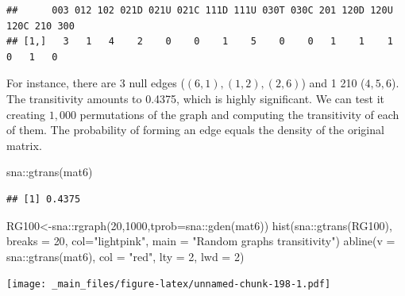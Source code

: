 \documentclass[
  notitlepage,
  onecolumn,
  openany]{book}
\newenvironment{Shaded}{\begin{snugshade}}{\end{snugshade}}
\newcommand{\AttributeTok}[1]{\textcolor[rgb]{0.77,0.63,0.00}{#1}}
\newcommand{\DecValTok}[1]{\textcolor[rgb]{0.00,0.00,0.81}{#1}}
\newcommand{\FunctionTok}[1]{\textcolor[rgb]{0.00,0.00,0.00}{#1}}
\newcommand{\NormalTok}[1]{#1}
\newcommand{\OtherTok}[1]{\textcolor[rgb]{0.56,0.35,0.01}{#1}}
\newcommand{\SpecialCharTok}[1]{\textcolor[rgb]{0.00,0.00,0.00}{#1}}
\newcommand{\StringTok}[1]{\textcolor[rgb]{0.31,0.60,0.02}{#1}}
\begin{document}
\begin{verbatim}
##      003 012 102 021D 021U 021C 111D 111U 030T 030C 201 120D 120U 120C 210 300
## [1,]   3   1   4    2    0    0    1    5    0    0   1    1    1    0   1   0
\end{verbatim}

For instance, there are 3 null edges (\((6,1), (1,2), (2,6)\)) and 1 210 (\(4,5,6\)). The transitivity amounts to 0.4375, which is highly significant. We can test it creating \(1,000\) permutations of the graph and computing the transitivity of each of them. The probability of forming an edge equals the density of the original matrix.

\begin{Shaded}
\begin{Highlighting}[]
\NormalTok{sna}\SpecialCharTok{::}\FunctionTok{gtrans}\NormalTok{(mat6)}
\end{Highlighting}
\end{Shaded}

\begin{verbatim}
## [1] 0.4375
\end{verbatim}

\begin{Shaded}
\begin{Highlighting}[]
\NormalTok{RG100}\OtherTok{\textless{}{-}}\NormalTok{sna}\SpecialCharTok{::}\FunctionTok{rgraph}\NormalTok{(}\DecValTok{20}\NormalTok{,}\DecValTok{1000}\NormalTok{,}\AttributeTok{tprob=}\NormalTok{sna}\SpecialCharTok{::}\FunctionTok{gden}\NormalTok{(mat6))}
\FunctionTok{hist}\NormalTok{(sna}\SpecialCharTok{::}\FunctionTok{gtrans}\NormalTok{(RG100), }\AttributeTok{breaks =} \DecValTok{20}\NormalTok{, }\AttributeTok{col=}\StringTok{"lightpink"}\NormalTok{,}
     \AttributeTok{main =} \StringTok{"Random graphs transitivity"}\NormalTok{)}
\FunctionTok{abline}\NormalTok{(}\AttributeTok{v =}\NormalTok{ sna}\SpecialCharTok{::}\FunctionTok{gtrans}\NormalTok{(mat6), }\AttributeTok{col =} \StringTok{"red"}\NormalTok{, }\AttributeTok{lty =} \DecValTok{2}\NormalTok{, }\AttributeTok{lwd =} \DecValTok{2}\NormalTok{)}
\end{Highlighting}
\end{Shaded}

\texttt{[image: \_main\_files/figure-latex/unnamed-chunk-198-1.pdf]}
\end{document}

